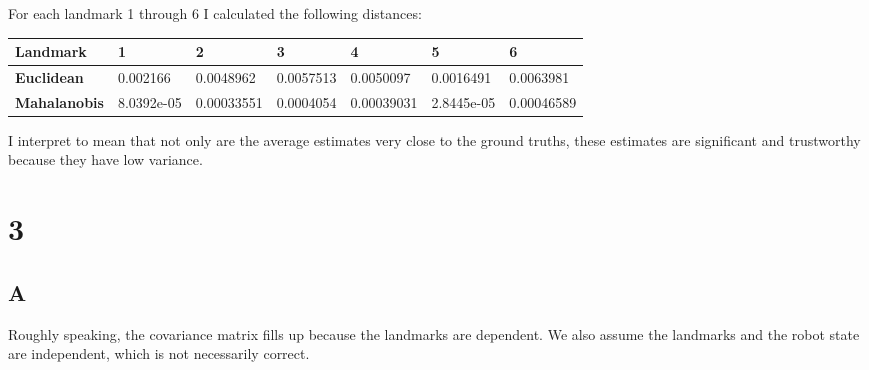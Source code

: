 \documentclass[letterpaper]{article}
\begin{document}
For each landmark 1 through 6 I calculated the following distances:
\begin{table}[H]
\centering
\begin{tabular}{|l|l|l|l|l|l|l|}
\hline
\textbf{Landmark}    & 1          & 2          & 3         & 4          & 5          & 6          \\ \hline
\textbf{Euclidean}   & 0.002166   & 0.0048962  & 0.0057513 & 0.0050097  & 0.0016491  & 0.0063981  \\ \hline
\textbf{Mahalanobis} & 8.0392e-05 & 0.00033551 & 0.0004054 & 0.00039031 & 2.8445e-05 & 0.00046589 \\ \hline
\end{tabular}
\end{table}

I interpret to mean that not only are the average estimates very close to the ground truths, these estimates are significant 
and trustworthy because they have low variance.

\section*{3}
\subsection*{A}
Roughly speaking, the covariance matrix fills up because the landmarks are dependent. We also assume the landmarks
and the robot state are independent, which is not necessarily correct. 
\end{document}
